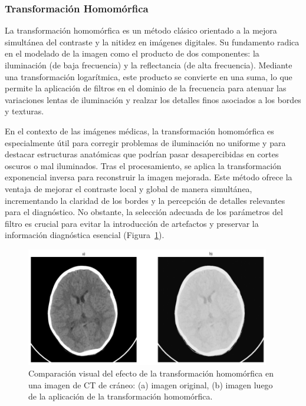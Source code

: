 \subsubsection{Transformación Homomórfica}

La transformación homomórfica \cite{HomomorphicFilter} es un método clásico orientado a la mejora simultánea del contraste y la nitidez en imágenes digitales. Su fundamento radica en el modelado de la imagen como el producto de dos componentes: la iluminación (de baja frecuencia) y la reflectancia (de alta frecuencia). Mediante una transformación logarítmica, este producto se convierte en una suma, lo que permite la aplicación de filtros en el dominio de la frecuencia para atenuar las variaciones lentas de iluminación y realzar los detalles finos asociados a los bordes y texturas.

En el contexto de las imágenes médicas, la transformación homomórfica es especialmente útil para corregir problemas de iluminación no uniforme y para destacar estructuras anatómicas que podrían pasar desapercibidas en cortes oscuros o mal iluminados. Tras el procesamiento, se aplica la transformación exponencial inversa para reconstruir la imagen mejorada. Este método ofrece la ventaja de mejorar el contraste local y global de manera simultánea, incrementando la claridad de los bordes y la percepción de detalles relevantes para el diagnóstico. No obstante, la selección adecuada de los parámetros del filtro es crucial para evitar la introducción de artefactos y preservar la información diagnóstica esencial (Figura~\ref{fig:filter-homomorphic}).

\begin{figure}[H]
    \centering
    \includegraphics[width=0.95\textwidth]{Graphics/homomorphic.png}
    \caption{Comparación visual del efecto de la transformación homomórfica en una imagen de CT de cráneo: (a) imagen original, (b) imagen luego de la aplicación de la transformación homomórfica.}
    \label{fig:filter-homomorphic}
\end{figure}

